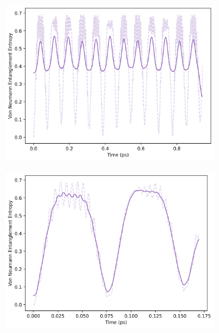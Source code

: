 \documentclass[12pt]{article}
\begin{document}
\begin{figure}[H]
    \centering
    \begin{subfigure}{0.49\textwidth}
        \centering
        \includegraphics[width=\linewidth]{Research Project/Code/results/ExVib/Closed/Envelope/vne.png}
        \caption{}
        \label{fig:EVM_CQS_Ent_env}
    \end{subfigure}
    \hfill
    \begin{subfigure}{0.49\textwidth}
        \centering
        \includegraphics[width=\linewidth]{Research Project/Code/results/ExVib/Closed/Fast/vne.png}
        \caption{}
        \label{fig:EVM_CQS_Ent_fast}
    \end{subfigure}
    
    \caption{}
    \label{fig:EVM_CQS_Ent}
\end{figure}
\end{document}
